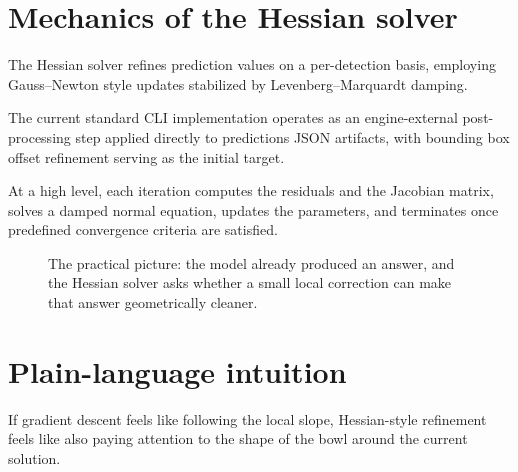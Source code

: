 \section{Mechanics of the Hessian solver}
The Hessian solver refines prediction values on a per-detection basis, employing Gauss--Newton style updates stabilized by Levenberg--Marquardt damping.

The current standard CLI implementation operates as an engine-external post-processing step applied directly to predictions JSON artifacts, with bounding box offset refinement serving as the initial target.

At a high level, each iteration computes the residuals and the Jacobian matrix, solves a damped normal equation, updates the parameters, and terminates once predefined convergence criteria are satisfied.

\begin{figure}[tbp]
\centering
{}
\caption{The practical picture: the model already produced an answer, and the Hessian solver asks whether a small local correction can make that answer geometrically cleaner.}
\end{figure}

\section{Plain-language intuition}
If gradient descent feels like following the local slope, Hessian-style refinement feels like also paying attention to the shape of the bowl around the current solution.

